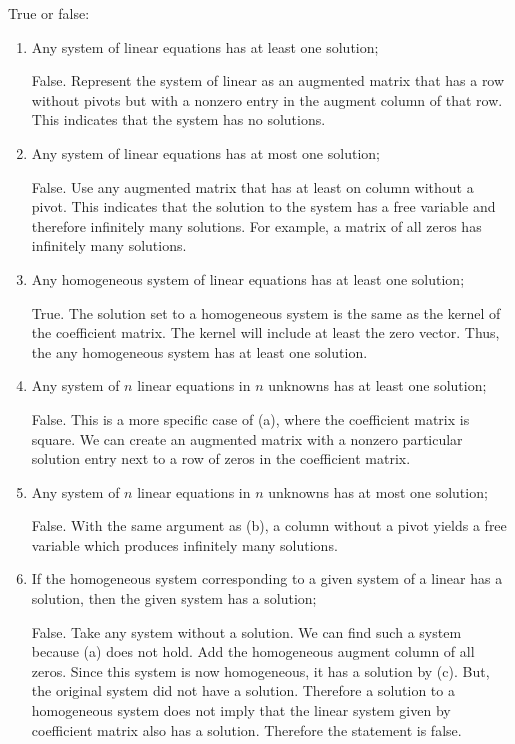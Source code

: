 \documentclass{article}
\begin{document}
True or false:
\begin{enumerate}[label=(\alph*)]
  \item Any system of linear equations has at least one solution;

    False. Represent the system of linear as an augmented matrix that has a row without pivots but with a nonzero entry in the augment column of that row. This indicates that the system has no solutions.

  \item Any system of linear equations has at most one solution;

    False. Use any augmented matrix that has at least on column without a pivot. This indicates that the solution to the system has a free variable and therefore infinitely many solutions. For example, a matrix of all zeros has infinitely many solutions.

  \item Any homogeneous system of linear equations has at least one solution;

    True. The solution set to a homogeneous system is the same as the kernel of the coefficient matrix. The kernel will include at least the zero vector. Thus, the any homogeneous system has at least one solution.

  \item Any system of $n$ linear equations in $n$ unknowns has at least one solution;

    False. This is a more specific case of (a), where the coefficient matrix is square. We can create an augmented matrix with a nonzero particular solution entry next to a row of zeros in the coefficient matrix.

  \item Any system of $n$ linear equations in $n$ unknowns has at most one solution;

    False. With the same argument as (b), a column without a pivot yields a free variable which produces infinitely many solutions.

  \item If the homogeneous system corresponding to a given system of a linear has a solution, then the given system has a solution;
  
    False. Take any system without a solution. We can find such a system because (a) does not hold. Add the homogeneous augment column of all zeros. Since this system is now homogeneous, it has a solution by (c). But, the original system did not have a solution. Therefore a solution to a homogeneous system does not imply that the linear system given by coefficient matrix also has a solution. Therefore the statement is false.
    

\end{enumerate}
\end{document}
